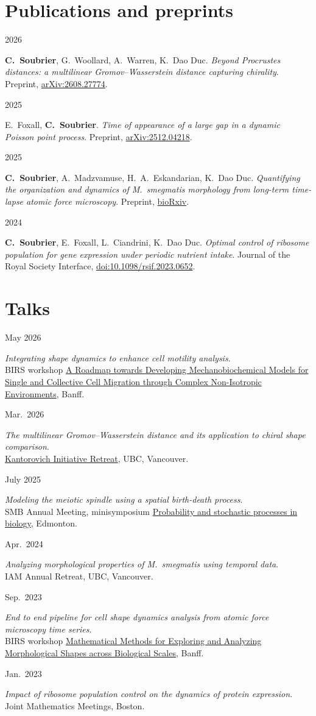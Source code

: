 \documentclass[10pt,a4paper]{article}
\newcommand{\entry}[2]{%
  \noindent\parbox[t]{3cm}{\raggedright\strut #1}%
  \parbox[t]{\dimexpr\linewidth-3cm}{#2}\par\vspace{0.35em}}
\begin{document}
\section{Publications and preprints}
\entry{2026}{\textbf{C.~Soubrier}, G.~Woollard, A.~Warren, K.~Dao Duc. \emph{Beyond Procrustes distances: a multilinear Gromov--Wasserstein distance capturing chirality}. Preprint, \href{https://arxiv.org/abs/2608.27774}{arXiv:2608.27774}.}
\entry{2025}{E.~Foxall, \textbf{C.~Soubrier}. \emph{Time of appearance of a large gap in a dynamic Poisson point process}. Preprint, \href{https://arxiv.org/abs/2512.04218}{arXiv:2512.04218}.}
\entry{2025}{\textbf{C.~Soubrier}, A.~Madzvamuse, H.~A.~Eskandarian, K.~Dao Duc. \emph{Quantifying the organization and dynamics of M.~smegmatis morphology from long-term time-lapse atomic force microscopy}. Preprint, \href{https://doi.org/10.1101/2025.01.17.633629}{bioRxiv}.}
\entry{2024}{\textbf{C.~Soubrier}, E.~Foxall, L.~Ciandrini, K.~Dao Duc. \emph{Optimal control of ribosome population for gene expression under periodic nutrient intake}. Journal of the Royal Society Interface, \href{https://doi.org/10.1098/rsif.2023.0652}{doi:10.1098/rsif.2023.0652}.}

\section{Talks}
\entry{May 2026}{\emph{Integrating shape dynamics to enhance cell motility analysis}.\\ BIRS workshop \href{https://www.birs.ca/events/2026/5-day-workshops/26w5573}{A Roadmap towards Developing Mechanobiochemical Models for Single and Collective Cell Migration through Complex Non-Isotropic Environments}, Banff.}
\entry{Mar.\ 2026}{\emph{The multilinear Gromov--Wasserstein distance and its application to chiral shape comparison}. \\ \href{https://pims.math.ca/events/260312-kikris}{Kantorovich Initiative Retreat}, UBC, Vancouver.}
\entry{July 2025}{\emph{Modeling the meiotic spindle using a spatial birth-death process}.\\ SMB Annual Meeting, minisymposium \href{https://2025.smb.org/MFBM/MS-MFBM-09-Part-2.html}{Probability and stochastic processes in biology}, Edmonton.}
\entry{Apr.\ 2024}{\emph{Analyzing morphological properties of M.~smegmatis using temporal data}. \\IAM Annual Retreat, UBC, Vancouver.}
\entry{Sep.\ 2023}{\emph{End to end pipeline for cell shape dynamics analysis from atomic force microscopy time series}.\\ BIRS workshop \href{https://www.birs.ca/events/2023/5-day-workshops/23w5142}{Mathematical Methods for Exploring and Analyzing Morphological Shapes across Biological Scales}, Banff.}
\entry{Jan.\ 2023}{\emph{Impact of ribosome population control on the dynamics of protein expression}.\\ Joint Mathematics Meetings, Boston.}
\end{document}
